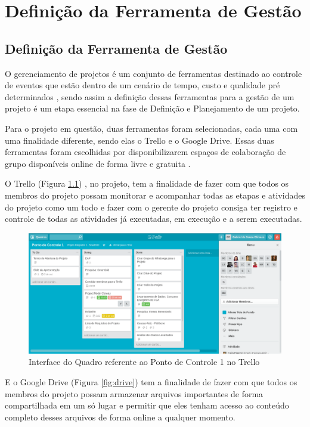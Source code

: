 \part{Definição da Ferramenta de Gestão}
\chapter[Definição da Ferramenta de Gestão]{Definição da Ferramenta de Gestão}

O gerenciamento de projetos é um conjunto de ferramentas destinado ao controle de eventos que estão dentro de um cenário de tempo, custo e qualidade pré determinados \cite{vargas2016gerenciamento}, sendo assim a definição dessas ferramentas para a gestão de um projeto é um etapa essencial na fase de Definição e Planejamento de um projeto.  

Para o projeto em questão, duas ferramentas foram selecionadas, cada uma com uma finalidade diferente, sendo elas o Trello e o Google Drive. Essas duas ferramentas foram escolhidas por disponibilizarem espaços de colaboração de grupo disponíveis online de forma livre e gratuita \cite{paulus2013digital}. 

O Trello (Figura \ref{fig:trello}) , no projeto, tem a finalidade de fazer com que todos os membros do projeto possam monitorar e acompanhar todas as etapas e atividades do projeto como um todo e fazer com o gerente do projeto consiga ter registro e controle de todas as atividades já executadas, em execução e a serem executadas.

\begin{figure}[!h]
	\centering
	\includegraphics[width=\textwidth]{figuras/trello.png}
	\caption{Interface do Quadro referente ao Ponto de Controle 1 no Trello}
	\label{fig:trello}
\end{figure}

E o Google Drive (Figura \ref{fig:drive}) tem a finalidade de fazer com que todos os membros do projeto possam armazenar arquivos importantes de forma compartilhada em um só lugar e permitir que eles tenham acesso ao conteúdo completo desses arquivos de forma online a qualquer momento.

